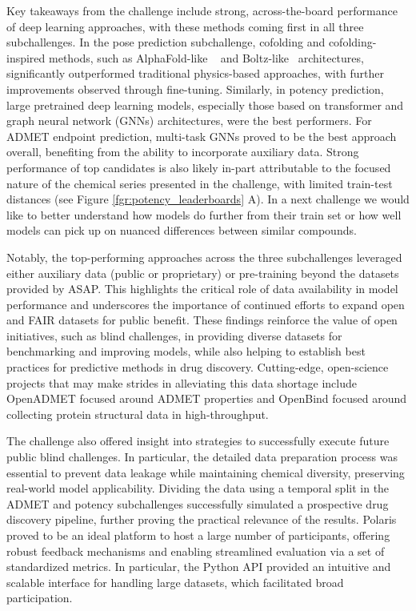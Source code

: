 \documentclass[journal=jcim,manuscript=article]{achemso}
\begin{document}
Key takeaways from the challenge include strong, across-the-board performance of deep learning approaches, with these methods coming first in all three subchallenges. In the pose prediction subchallenge, cofolding and cofolding-inspired methods, such as AlphaFold-like ~\cite{abramson_2024_alphafold} and Boltz-like~\cite{wohlwend_2024_boltz-1, passaro_2025_boltz-2} architectures, significantly outperformed traditional physics-based approaches, with further improvements observed through fine-tuning. Similarly, in potency prediction, large pretrained deep learning models, especially those based on transformer and graph neural network (GNNs) architectures, were the best performers. For ADMET endpoint prediction, multi-task GNNs proved to be the best approach overall, benefiting from the ability to incorporate auxiliary data. Strong performance of top candidates is also likely in-part attributable to the focused nature of the chemical series presented in the challenge, with limited train-test distances (see Figure \ref{fgr:potency_leaderboards} A). In a next challenge we would like to better understand how models do further from their train set or how well models can pick up on nuanced differences between similar compounds.

Notably, the top-performing approaches across the three subchallenges leveraged either auxiliary data (public or proprietary) or pre-training beyond the datasets provided by ASAP. This highlights the critical role of data availability in model performance and underscores the importance of continued efforts to expand open and FAIR\cite{wilkinson_fair_2016} datasets for public benefit. These findings reinforce the value of open initiatives, such as blind challenges, in providing diverse datasets for benchmarking and improving models, while also helping to establish best practices for predictive methods in drug discovery. Cutting-edge, open-science projects that may make strides in alleviating this data shortage include OpenADMET focused around ADMET properties and OpenBind\cite{openbind_2025} focused around collecting protein structural data in high-throughput.

The challenge also offered insight into strategies to successfully execute future public blind challenges. In particular, the detailed data preparation process was essential to prevent data leakage while maintaining chemical diversity, preserving real-world model applicability. Dividing the data using a temporal split in the ADMET and potency subchallenges successfully simulated a prospective drug discovery pipeline, further proving the practical relevance of the results.
Polaris proved to be an ideal platform to host a large number of participants, offering robust feedback mechanisms and enabling streamlined evaluation via a set of standardized metrics. In particular, the Python API provided an intuitive and scalable interface for handling large datasets, which facilitated broad participation. 
\end{document}
